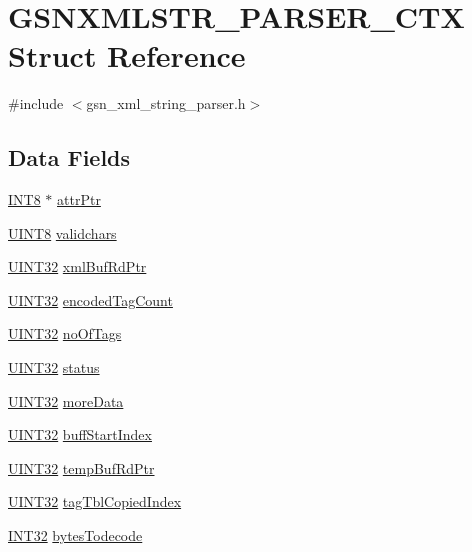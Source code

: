 \hypertarget{a00444}{
\section{GSNXMLSTR\_\-PARSER\_\-CTX Struct Reference}
\label{a00444}
}


{\ttfamily \#include $<$gsn\_\-xml\_\-string\_\-parser.h$>$}

\subsection*{Data Fields}
\begin{DoxyCompactItemize}
\item 
\hyperlink{a00660_ga307b8734c020247f6bac4fcde0dcfbb9}{INT8} $\ast$ \hyperlink{a00444_aa29cdb4e4e5fa93e7e675604f5e229e2}{attrPtr}
\item 
\hyperlink{a00660_gab27e9918b538ce9d8ca692479b375b6a}{UINT8} \hyperlink{a00444_ab3f500e5a0f070b238e5dbde5f53e27e}{validchars}
\item 
\hyperlink{a00660_gae1e6edbbc26d6fbc71a90190d0266018}{UINT32} \hyperlink{a00444_aab18734f6d9450f7384a5d3565c931b7}{xmlBufRdPtr}
\item 
\hyperlink{a00660_gae1e6edbbc26d6fbc71a90190d0266018}{UINT32} \hyperlink{a00444_a870bf7003d973454764fa37ac86f0c7b}{encodedTagCount}
\item 
\hyperlink{a00660_gae1e6edbbc26d6fbc71a90190d0266018}{UINT32} \hyperlink{a00444_a1943ca791677dc1fd4be8e9d736df3ee}{noOfTags}
\item 
\hyperlink{a00660_gae1e6edbbc26d6fbc71a90190d0266018}{UINT32} \hyperlink{a00444_ac6b7193d1fe7063cf448ef96398230d8}{status}
\item 
\hyperlink{a00660_gae1e6edbbc26d6fbc71a90190d0266018}{UINT32} \hyperlink{a00444_ac22d776ac2378280cc3c0b3b84141d02}{moreData}
\item 
\hyperlink{a00660_gae1e6edbbc26d6fbc71a90190d0266018}{UINT32} \hyperlink{a00444_a6178554e1bb83aae2258e3cc168aec36}{buffStartIndex}
\item 
\hyperlink{a00660_gae1e6edbbc26d6fbc71a90190d0266018}{UINT32} \hyperlink{a00444_a6b5660b20189e02a301bfd0f04ad45f3}{tempBufRdPtr}
\item 
\hyperlink{a00660_gae1e6edbbc26d6fbc71a90190d0266018}{UINT32} \hyperlink{a00444_a18a691285c94ec64a67d3c0ec6b03a74}{tagTblCopiedIndex}
\item 
\hyperlink{a00660_ga63021d67d54286c2163bcdb43a6f2569}{INT32} \hyperlink{a00444_a1058fa8ac42f111ebc5e4efeea0afaa3}{bytesTodecode}

\end{DoxyCompactItemize}
